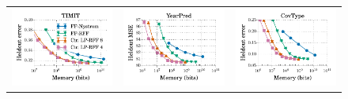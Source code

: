\begin{figure}
	\centering
	\begin{small}
	\begin{tabular}{@{\hskip -0.05in}c@{\hskip -0.1in}c@{\hskip -0.1in}c@{\hskip -0.05in}}
		\includegraphics[width=0.34\linewidth]{figures/timit_error_vs_n_memory.pdf} &	
		\includegraphics[width=0.34\linewidth]{figures/yearpred_MSE_vs_n_memory.pdf} &
		\includegraphics[width=0.34\linewidth]{figures/covtype_error_vs_n_memory.pdf}

\end{tabular}
\end{small}
\end{figure}
